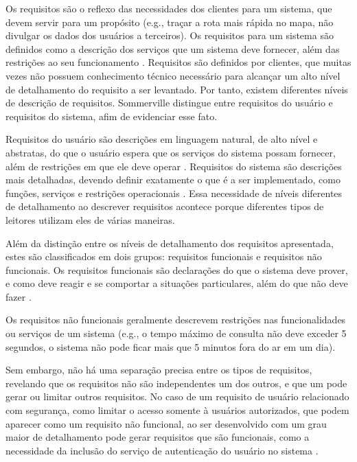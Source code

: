 Os requisitos são o reflexo das necessidades dos clientes para um sistema, que devem servir para um propósito (e.g., traçar a rota mais rápida no mapa, não divulgar os dados dos usuários a terceiros). Os requisitos para um sistema são definidos como a descrição dos serviços que um sistema deve fornecer, além das restrições ao seu funcionamento \cite{sommerville2015software}. 
Requisitos são definidos por clientes, que muitas vezes não possuem conhecimento técnico necessário para alcançar um alto nível de detalhamento do requisito a ser levantado. Por tanto, existem diferentes níveis de descrição de requisitos. Sommerville \cite{sommerville2015software} distingue entre requisitos do usuário e requisitos do sistema, afim de evidenciar esse fato. 

Requisitos do usuário são descrições em linguagem natural, de alto nível e abstratas, do que o usuário espera que os serviços do sistema possam fornecer, além de restrições em que ele deve operar \cite{sommerville2015software}. Requisitos do sistema são descrições mais detalhadas, devendo definir exatamente o que é a ser implementado, como funções, serviços e restrições operacionais \cite{sommerville2015software}. Essa necessidade de níveis diferentes de detalhamento ao descrever requisitos acontece porque diferentes tipos de leitores utilizam eles de várias maneiras.

Além da distinção entre os níveis de detalhamento dos requisitos apresentada, estes são classificados em dois grupos: requisitos funcionais e requisitos não funcionais.
Os requisitos funcionais são declarações do que o sistema deve prover, e como deve reagir e se comportar a situações particulares, além do que não deve fazer \cite{sommerville2015software}.

Os requisitos não funcionais geralmente descrevem restrições nas funcionalidades ou serviços de um sistema (e.g., o tempo máximo de consulta não deve exceder 5 segundos, o sistema não pode ficar mais que 5 minutos fora do ar em um dia).  

Sem embargo, não há uma separação precisa entre os tipos de requisitos, revelando que os requisitos não são independentes um dos outros, e que um pode gerar ou limitar outros requisitos. No caso de um requisito de usuário relacionado com segurança, como limitar o acesso somente à usuários autorizados, que podem aparecer como um requisito não funcional, ao ser desenvolvido com um grau maior de detalhamento pode gerar requisitos que são funcionais, como a necessidade da inclusão do serviço de autenticação do usuário no sistema \cite{sommerville2015software}.

